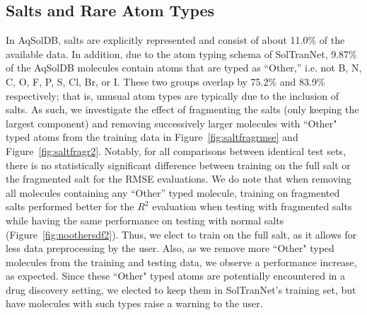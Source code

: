 \documentclass[journal=jmcmar,manuscript=article]{achemso}
\begin{document}
\subsection{Salts and Rare Atom Types}
In AqSolDB, salts are explicitly represented and consist of about 11.0\% of the available data.
In addition, due to the atom typing schema of SolTranNet, 9.87\% of the AqSolDB molecules contain atoms that are typed as ``Other,'' i.e. not B, N, C, O, F, P, S, Cl, Br, or I.
These two groups overlap by 75.2\% and 83.9\% respectively; that is, unusual atom types are typically due to the inclusion of salts.
As such, we investigate the effect of fragmenting the salts (only keeping the largest component) and removing successively larger molecules with ``Other" typed atoms from the training data in Figure~\ref{fig:saltfragrmse} and Figure~\ref{fig:saltfragr2}.
Notably, for all comparisons between identical test sets, there is no statistically significant difference between training on the full salt or the fragmented salt for the RMSE evaluations.
We do note that when removing all molecules containing any ``Other'' typed molecule, training on fragmented salts performed better for the $R^2$ evaluation when testing with fragmented salts while having the same performance on testing with normal salts (Figure~\ref{fig:noothersdf2}).
Thus, we elect to train on the full salt, as it allows for less data preprocessing by the user.
Also, as we remove more ``Other" typed molecules from the training and testing data, we observe a performance increase, as expected.
Since these ``Other" typed atoms are potentially encountered in a drug discovery setting, we elected to keep them in SolTranNet's training set, but have molecules with such types raise a warning to the user.
\end{document}
